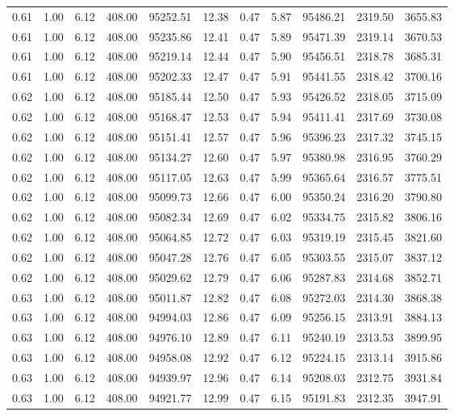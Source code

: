 \begin{table}[!ht]
\begin{tabular}{rrrrrrrrrrr}
0.61 & 1.00 & 6.12 & 408.00 & 95252.51 & 12.38 & 0.47 & 5.87 & 95486.21 & 2319.50 & 3655.83 \\
0.61 & 1.00 & 6.12 & 408.00 & 95235.86 & 12.41 & 0.47 & 5.89 & 95471.39 & 2319.14 & 3670.53 \\
0.61 & 1.00 & 6.12 & 408.00 & 95219.14 & 12.44 & 0.47 & 5.90 & 95456.51 & 2318.78 & 3685.31 \\
0.61 & 1.00 & 6.12 & 408.00 & 95202.33 & 12.47 & 0.47 & 5.91 & 95441.55 & 2318.42 & 3700.16 \\
0.62 & 1.00 & 6.12 & 408.00 & 95185.44 & 12.50 & 0.47 & 5.93 & 95426.52 & 2318.05 & 3715.09 \\
0.62 & 1.00 & 6.12 & 408.00 & 95168.47 & 12.53 & 0.47 & 5.94 & 95411.41 & 2317.69 & 3730.08 \\
0.62 & 1.00 & 6.12 & 408.00 & 95151.41 & 12.57 & 0.47 & 5.96 & 95396.23 & 2317.32 & 3745.15 \\
0.62 & 1.00 & 6.12 & 408.00 & 95134.27 & 12.60 & 0.47 & 5.97 & 95380.98 & 2316.95 & 3760.29 \\
0.62 & 1.00 & 6.12 & 408.00 & 95117.05 & 12.63 & 0.47 & 5.99 & 95365.64 & 2316.57 & 3775.51 \\
0.62 & 1.00 & 6.12 & 408.00 & 95099.73 & 12.66 & 0.47 & 6.00 & 95350.24 & 2316.20 & 3790.80 \\
0.62 & 1.00 & 6.12 & 408.00 & 95082.34 & 12.69 & 0.47 & 6.02 & 95334.75 & 2315.82 & 3806.16 \\
0.62 & 1.00 & 6.12 & 408.00 & 95064.85 & 12.72 & 0.47 & 6.03 & 95319.19 & 2315.45 & 3821.60 \\
0.62 & 1.00 & 6.12 & 408.00 & 95047.28 & 12.76 & 0.47 & 6.05 & 95303.55 & 2315.07 & 3837.12 \\
0.62 & 1.00 & 6.12 & 408.00 & 95029.62 & 12.79 & 0.47 & 6.06 & 95287.83 & 2314.68 & 3852.71 \\
0.63 & 1.00 & 6.12 & 408.00 & 95011.87 & 12.82 & 0.47 & 6.08 & 95272.03 & 2314.30 & 3868.38 \\
0.63 & 1.00 & 6.12 & 408.00 & 94994.03 & 12.86 & 0.47 & 6.09 & 95256.15 & 2313.91 & 3884.13 \\
0.63 & 1.00 & 6.12 & 408.00 & 94976.10 & 12.89 & 0.47 & 6.11 & 95240.19 & 2313.53 & 3899.95 \\
0.63 & 1.00 & 6.12 & 408.00 & 94958.08 & 12.92 & 0.47 & 6.12 & 95224.15 & 2313.14 & 3915.86 \\
0.63 & 1.00 & 6.12 & 408.00 & 94939.97 & 12.96 & 0.47 & 6.14 & 95208.03 & 2312.75 & 3931.84 \\
0.63 & 1.00 & 6.12 & 408.00 & 94921.77 & 12.99 & 0.47 & 6.15 & 95191.83 & 2312.35 & 3947.91 \\

\end{tabular}
\end{table}
